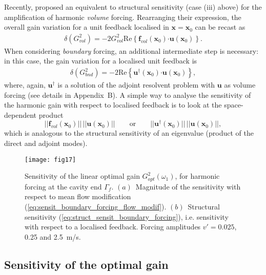 \documentclass[11pt,onecolumn]{article}
\def\xx{\mathbf{x}}%
\def\be{\begin{equation}}
\def\ee{\end{equation}}
\def\ff {\mathbf{f}}
\def\uu {\mathbf{u}}
\def\feedback {\mathbf{fb}}
\providecommand\bcdot{\boldsymbol{\cdot}}
\begin{document}
Recently, \cite{Qadri17} proposed an equivalent to structural sensitivity (case (iii) above) for the  amplification of harmonic \textit{volume} forcing.
Rearranging their expression, the overall gain variation  for a unit feedback localised in $\xx=\xx_0$ can be recast as 
\begin{align}
%
\delta (G_{vol}^2) 
= -2 G_{vol}^2 \mbox{Re} \left\{ \ff_{vol}(\xx_0) \bcdot  \uu(\xx_0) \right\}.
\label{eq:struct_sensit_volume_forcing}
\end{align}
%
When considering \textit{boundary} forcing, an additional intermediate step is necessary: in this case, the gain variation for a localised unit feedback is 
\begin{align}
%
\delta (G_{bnd}^2) 
= -2 \mbox{Re} \left\{ \uu^\dag(\xx_0) \bcdot  \uu(\xx_0) \right\},
\label{eq:struct_sensit_boundary_forcing}
\end{align}
%
where, again, $\uu^\dag$ is a solution of the adjoint resolvent problem with $\uu$ as volume forcing (see details in Appendix~B).
%
A simple way to analyse the sensitivity of the harmonic gain with respect to localised feedback is to look at the space-dependent product
\be 
||\ff_{vol}(\xx_0)|| \, ||\uu(\xx_0)|| 
\qquad \mbox{or} \qquad
||\uu^\dag(\xx_0)|| \, ||\uu(\xx_0)||, 
\ee
which is analogous to the structural sensitivity of an eigenvalue (product of the direct and adjoint modes).


\begin{figure}[] %
\centerline{
\texttt{[image: fig17]}
}
\vspace{-0.2cm}
\caption{
Sensitivity of the linear optimal gain $G_{opt}^2(\omega_1)$, for harmonic forcing at the cavity end $\Gamma_f$.
$(a)$~Magnitude of the sensitivity with respect to mean flow modification (\ref{eq:sensit_boundary_forcing_flow_modif}).
$(b)$~Structural sensitivity (\ref{eq:struct_sensit_boundary_forcing}), i.e. sensitivity with respect to a localised feedback.
Forcing amplitudes $v'=0.025$, 0.25 and 2.5~m/s.
} 
\label{fig:wavemaker_and_sensit_BFmod_mag}
\end{figure}


\subsection{Sensitivity of the optimal gain}
\end{document}
